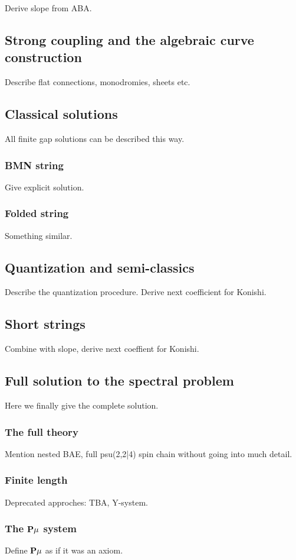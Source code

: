 Derive slope from ABA.

\subsection{Strong coupling and the algebraic curve construction}

Describe flat connections, monodromies, sheets etc.

\subsection{Classical solutions}

All finite gap solutions can be described this way.

\subsubsection{BMN string}

Give explicit solution.

\subsubsection{Folded string}

Something similar.

\subsection{Quantization and semi-classics}

Describe the quantization procedure. Derive next coefficient for Konishi.

\subsection{Short strings}

Combine with slope, derive next coeffient for Konishi.

\subsection{Full solution to the spectral problem}

Here we finally give the complete solution.

\subsubsection{The full theory}

Mention nested BAE, full psu(2,2|4) spin chain without going into much detail.

\subsubsection{Finite length}

Deprecated approches: TBA, Y-system.

\subsubsection{The ${\bf P}\mu$ system}

Define ${\bf P}\mu$ as if it was an axiom.
